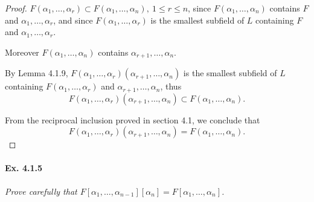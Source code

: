 \documentclass[11pt,a4paper]{article}
\begin{document}
\begin{proof}  $F(\alpha_1,\ldots,\alpha_r) \subset F(\alpha_1,\ldots,\alpha_n),\ 1\leq r \leq n$, since $F(\alpha_1,\ldots,\alpha_n)$ contains $F$ and $\alpha_1,\ldots,\alpha_r$, and since $F(\alpha_1,\ldots,\alpha_r)$ is the smallest subfield of $L$ containing $F$ and $\alpha_1,\ldots,\alpha_r$.

Moreover $F(\alpha_1,\ldots,\alpha_n)$ contains $\alpha_{r+1}, \ldots, \alpha_n$.

By Lemma 4.1.9, $F(\alpha_1,\ldots,\alpha_r)(\alpha_{r+1},\ldots,\alpha_n)$ is the smallest subfield of $L$ containing $F(\alpha_1,\ldots,\alpha_r)$ and $\alpha_{r+1},\ldots,\alpha_n$, thus 
$$F(\alpha_1,\ldots,\alpha_r)(\alpha_{r+1},\ldots,\alpha_n) \subset F(\alpha_1,\ldots,\alpha_n).$$

From the reciprocal inclusion proved in section 4.1, we conclude that
$$F(\alpha_1,\ldots,\alpha_r)(\alpha_{r+1},\ldots,\alpha_n) = F(\alpha_1,\ldots,\alpha_n).$$
\end{proof}

\paragraph{Ex. 4.1.5}

{\it Prove carefully that $F[\alpha_1,\ldots,\alpha_{n-1}][\alpha_n] = F[\alpha_1,\ldots,\alpha_n]$.
}
\end{document}
